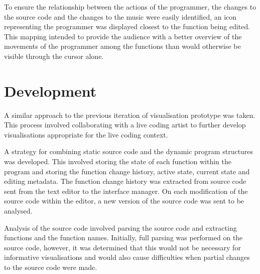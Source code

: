 
To ensure the relationship between the actions of the programmer, the changes to the source code and the changes to the music were easily identified, an icon representing the programmer was displayed closest to the function being edited. This mapping intended to provide the audience with a better overview of the movements of the programmer among the functions than would otherwise be visible through the cursor alone.  







\section{Development}

A similar approach to the previous iteration of visualisation prototype was taken. This process involved collaborating with a live coding artist to further develop visualisations appropriate for the live coding context.

A strategy for combining static source code and the dynamic program structures was developed. This involved storing the state of each function within the program and storing the function change history, active state, current state and editing metadata. The function change history was extracted from source code sent from the text editor to the interface manager. On each modification of the source code within the editor, a new version of the source code was sent to be analysed.

Analysis of the source code involved parsing the source code and extracting functions and the function names. Initially, full parsing was performed on the source code, however, it was determined that this would not be necessary for informative visualisations and would also cause difficulties when partial changes to the source code were made. 

